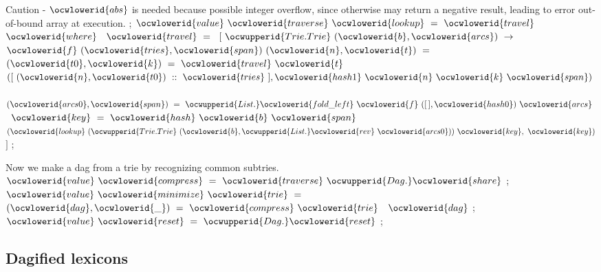 \documentclass[12pt]{article}
\begin{document}
\ocwendcode{}\ocwindent{0.00em}
Caution - \ocwbegindcode{}$\ocwlowerid{abs}$\ocwenddcode{} is needed because possible integer overflow, since otherwise \ocwbegindcode{}\ocwenddcode{} may 
   return a negative result, leading to error out-of-bound array at execution. 
\ocweol
\label{../ML/mini.ml:1502}%
\medskip
\ocwbegincode{}\ocwindent{0.00em}
;\ocweol
\ocwindent{0.00em}
$\ocwlowerid{value}~\ocwlowerid{traverse}~\ocwlowerid{lookup}~=~\ocwlowerid{travel}$\ocweol
\ocwindent{0.50em}
$\ocwlowerid{where}~$~$\ocwlowerid{travel}~=~$\ocweol
\ocwindent{1.00em}
$[~\ocwupperid{Trie.Trie}~(\ocwlowerid{b},\ocwlowerid{arcs})~\rightarrow{}~$\ocweol
\ocwindent{2.00em}
~$\ocwlowerid{f}~(\ocwlowerid{tries},\ocwlowerid{span})~(\ocwlowerid{n},\ocwlowerid{t})~=~$\ocweol
\ocwindent{3.50em}
~$(\ocwlowerid{t0},\ocwlowerid{k})~=~\ocwlowerid{travel}~\ocwlowerid{t}~$\ocweol
\ocwindent{3.50em}
$([~(\ocwlowerid{n},\ocwlowerid{t0})~::~\ocwlowerid{tries}~],\ocwlowerid{hash1}~\ocwlowerid{n}~\ocwlowerid{k}~\ocwlowerid{span})~$\ocweol
\ocwindent{2.00em}
~$(\ocwlowerid{arcs0},\ocwlowerid{span})~=~\ocwupperid{List.}\ocwlowerid{fold\_left}~\ocwlowerid{f}~([\,],\ocwlowerid{hash0})~\ocwlowerid{arcs}~$\ocweol
\ocwindent{2.00em}
~$\ocwlowerid{key}~=~\ocwlowerid{hash}~\ocwlowerid{b}~\ocwlowerid{span}~$\ocweol
\ocwindent{2.00em}
$(\ocwlowerid{lookup}~(\ocwupperid{Trie.Trie}~(\ocwlowerid{b},\ocwupperid{List.}\ocwlowerid{rev}~\ocwlowerid{arcs0}))~\ocwlowerid{key},~\ocwlowerid{key})$\ocweol
\ocwindent{1.00em}
$]$\ocweol
\ocwindent{0.00em}
;\medskip

\ocwendcode{}\ocwindent{0.00em}
Now we make a dag from a trie by recognizing common subtries. 
\ocweol
\label{../ML/mini.ml:1913}%
\medskip
\ocwbegincode{}\ocwindent{0.00em}
$\ocwlowerid{value}~\ocwlowerid{compress}~=~\ocwlowerid{traverse}~\ocwupperid{Dag.}\ocwlowerid{share}$\ocweol
\ocwindent{0.00em}
;\ocweol
\ocwindent{0.00em}
$\ocwlowerid{value}~\ocwlowerid{minimize}~\ocwlowerid{trie}~=~$~$(\ocwlowerid{dag},\ocwlowerid{\_})~=~\ocwlowerid{compress}~\ocwlowerid{trie}~$~$\ocwlowerid{dag}$\ocweol
\ocwindent{0.00em}
;\ocweol
\ocwindent{0.00em}
$\ocwlowerid{value}~\ocwlowerid{reset}~=~\ocwupperid{Dag.}\ocwlowerid{reset}$\ocweol
\ocwindent{0.00em}
;\ocweol
\ocweol
\ocwendcode{}\subsection{Dagified lexicons}
\end{document}
